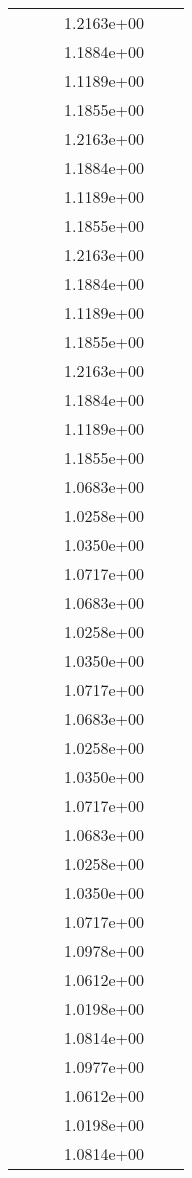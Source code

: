 \begin{xltabular}{\textwidth}{r|rS[table-format=1.3e+2]S[table-format=1.4e+2]S[table-format=1.4e+2]S[table-format=-1.5]}
&  &  & 1.2163e+00 & & \\
&  &  & 1.1884e+00 & & \\
&  &  & 1.1189e+00 & & \\
&  &  & 1.1855e+00 & & \\
&  &  & 1.2163e+00 & & \\
&  &  & 1.1884e+00 & & \\
&  &  & 1.1189e+00 & & \\
&  &  & 1.1855e+00 & & \\
&  &  & 1.2163e+00 & & \\
&  &  & 1.1884e+00 & & \\
&  &  & 1.1189e+00 & & \\
&  &  & 1.1855e+00 & & \\
&  &  & 1.2163e+00 & & \\
&  &  & 1.1884e+00 & & \\
&  &  & 1.1189e+00 & & \\
&  &  & 1.1855e+00 & & \\
&  &  & 1.0683e+00 & & \\
&  &  & 1.0258e+00 & & \\
&  &  & 1.0350e+00 & & \\
&  &  & 1.0717e+00 & & \\
&  &  & 1.0683e+00 & & \\
&  &  & 1.0258e+00 & & \\
&  &  & 1.0350e+00 & & \\
&  &  & 1.0717e+00 & & \\
&  &  & 1.0683e+00 & & \\
&  &  & 1.0258e+00 & & \\
&  &  & 1.0350e+00 & & \\
&  &  & 1.0717e+00 & & \\
&  &  & 1.0683e+00 & & \\
&  &  & 1.0258e+00 & & \\
&  &  & 1.0350e+00 & & \\
&  &  & 1.0717e+00 & & \\
&  &  & 1.0978e+00 & & \\
&  &  & 1.0612e+00 & & \\
&  &  & 1.0198e+00 & & \\
&  &  & 1.0814e+00 & & \\
&  &  & 1.0977e+00 & & \\
&  &  & 1.0612e+00 & & \\
&  &  & 1.0198e+00 & & \\
&  &  & 1.0814e+00 & & \\

\end{xltabular}
